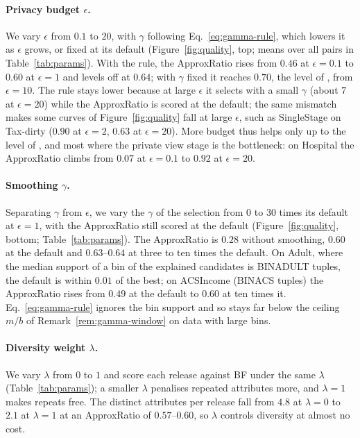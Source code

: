\paragraph{Privacy budget $\epsilon$.}
We vary $\epsilon$ from $0.1$ to $20$, with $\gamma$ following Eq.~\eqref{eq:gamma-rule}, which lowers it as $\epsilon$ grows, or fixed at its default (Figure~\ref{fig:quality}, top; means over all pairs in Table~\ref{tab:params}).
With the rule, the ApproxRatio rises from $0.46$ at $\epsilon=0.1$ to $0.60$ at $\epsilon=1$ and levels off at $0.64$; with $\gamma$ fixed it reaches $0.70$, the level of \Bone{}, from $\epsilon=10$.
The rule stays lower because at large $\epsilon$ it selects with a small $\gamma$ (about $7$ at $\epsilon=20$) while the ApproxRatio is scored at the default; the same mismatch makes some curves of Figure~\ref{fig:quality} fall at large $\epsilon$, such as \textsf{SingleStage} on Tax-dirty ($0.90$ at $\epsilon=2$, $0.63$ at $\epsilon=20$).
More budget thus helps only up to the level of \Bone{}, and most where the private view stage is the bottleneck: on Hospital the ApproxRatio climbs from $0.07$ at $\epsilon=0.1$ to $0.92$ at $\epsilon=20$.

\paragraph{Smoothing $\gamma$.}
Separating $\gamma$ from $\epsilon$, we vary the $\gamma$ of the selection from $0$ to $30$ times its default at $\epsilon=1$, with the ApproxRatio still scored at the default (Figure~\ref{fig:quality}, bottom; Table~\ref{tab:params}).
The ApproxRatio is $0.28$ without smoothing, $0.60$ at the default and $0.63$--$0.64$ at three to ten times the default.
On Adult, where the median support of a bin of the explained candidates is BINADULT tuples, the default is within $0.01$ of the best; on ACSIncome (BINACS tuples) the ApproxRatio rises from $0.49$ at the default to $0.60$ at ten times it.
Eq.~\eqref{eq:gamma-rule} ignores the bin support and so stays far below the ceiling $m/b$ of Remark~\ref{rem:gamma-window} on data with large bins.

\paragraph{Diversity weight $\lambda$.}
We vary $\lambda$ from $0$ to $1$ and score each release against \textsf{BF} under the same $\lambda$ (Table~\ref{tab:params}); a smaller $\lambda$ penalises repeated attributes more, and $\lambda=1$ makes repeats free.
The distinct attributes per release fall from $4.8$ at $\lambda=0$ to $2.1$ at $\lambda=1$ at an ApproxRatio of $0.57$--$0.60$, so $\lambda$ controls diversity at almost no cost.

